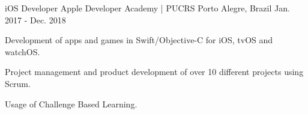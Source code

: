 \begin{cventries}
  \cventry
    {iOS Developer}
    {Apple Developer Academy | PUCRS}
    {Porto Alegre, Brazil}
    {Jan. 2017 - Dec. 2018}
    {
      \begin{cvitems}
        \item {Development of apps and games in Swift/Objective-C for iOS, tvOS and watchOS.}
        \item {Project management and product development of over 10 different projects using Scrum.}
        \item {Usage of Challenge Based Learning.}
      \end{cvitems}
    }
\end{cventries}
